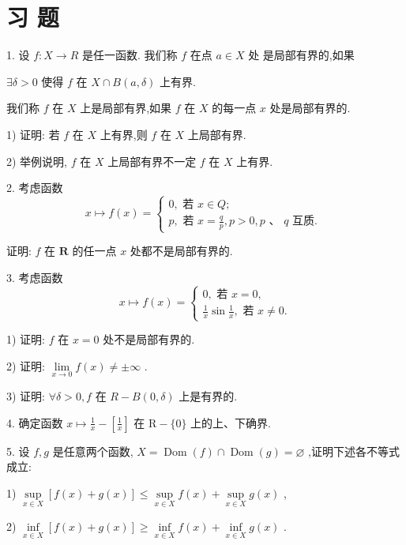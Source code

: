 \section*{习 题}

1. 设 $f : X \rightarrow  R$ 是任一函数. 我们称 $f$ 在点 $a \in  X$ 处 是局部有界的,如果

$\exists \delta  > 0$ 使得 $f$ 在 $X \cap  B\left( {a,\delta }\right)$ 上有界.

我们称 $f$ 在 $X$ 上是局部有界,如果 $f$ 在 $X$ 的每一点 $x$ 处是局部有界的.

1) 证明: 若 $f$ 在 $X$ 上有界,则 $f$ 在 $X$ 上局部有界.

2) 举例说明, $f$ 在 $X$ 上局部有界不一定 $f$ 在 $X$ 上有界.

2. 考虑函数
$$x \mapsto  f\left( x\right)  = \left\{  \begin{array}{l} 0,\text{ 若 }x \in  Q; \\  p,\text{ 若 }x = \frac{q}{p},p > 0,p\text{ 、 }q\text{ 互质. } \end{array}\right.$$

证明: $f$ 在 $\mathbf{R}$ 的任一点 $x$ 处都不是局部有界的.

3. 考虑函数
$$x \mapsto  f\left( x\right)  = \left\{  \begin{array}{l} 0,\text{ 若 }x = 0, \\  \frac{1}{x}\sin \frac{1}{x},\text{ 若 }x \neq  0. \end{array}\right.$$

1) 证明: $f$ 在 $x = 0$ 处不是局部有界的.

2) 证明: $\mathop{\lim }\limits_{{x \rightarrow  0}}f\left( x\right)  \neq   \pm  \infty$ .

3) 证明: $\forall \delta  > 0,f$ 在 $R - B\left( {0,\delta }\right)$ 上是有界的.

4. 确定函数 $x \mapsto  \frac{1}{x} - \left\lbrack  \frac{1}{x}\right\rbrack$ 在 $\mathrm{R} - \{ 0\}$ 上的上、下确界.

5. 设 $f,g$ 是任意两个函数, $X = \operatorname{Dom}\left( f\right)  \cap  \operatorname{Dom}\left( g\right)  = \varnothing$ ,证明下述各不等式成立:

1) $\mathop{\sup }\limits_{{x \in  X}}\left\lbrack  {f\left( x\right)  + g\left( x\right) }\right\rbrack   \leq  \mathop{\sup }\limits_{{x \in  X}}f\left( x\right)  + \mathop{\sup }\limits_{{x \in  X}}g\left( x\right)$ ,

2) $\mathop{\inf }\limits_{{x \in  X}}\left\lbrack  {f\left( x\right)  + g\left( x\right) }\right\rbrack   \geq  \mathop{\inf }\limits_{{x \in  X}}f\left( x\right)  + \mathop{\inf }\limits_{{x \in  X}}g\left( x\right)$ .

